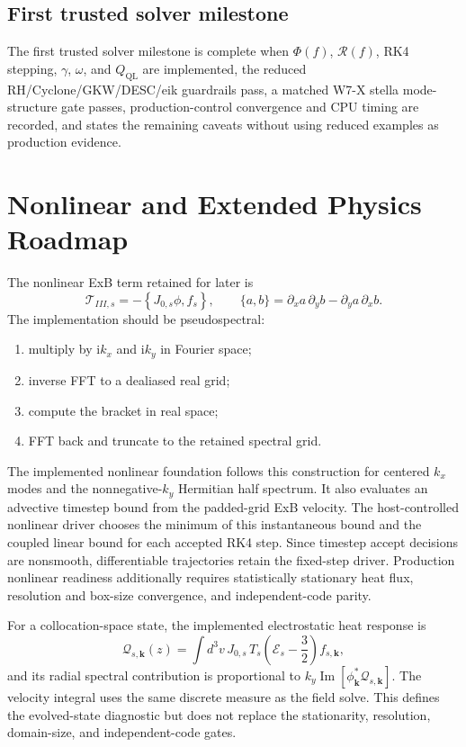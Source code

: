 \documentclass[11pt,a4paper]{article}
\newcommand{\ii}{\mathrm{i}}
\newcommand{\RHS}{\mathcal{R}}
\begin{document}
\subsection{First trusted solver milestone}

The first trusted solver milestone is complete when \(\Phi(f)\), \(\RHS(f)\),
RK4 stepping, \(\gamma\), \(\omega\), and \(Q_{\mathrm{QL}}\) are implemented,
the reduced RH/Cyclone/GKW/DESC/eik guardrails pass, a matched W7-X stella
mode-structure gate passes, production-control convergence and CPU timing are
recorded, and  states the remaining caveats without using
reduced examples as production evidence.

\appendix
\section{Nonlinear and Extended Physics Roadmap}
\label{sec:nonlinear-extension}

The nonlinear ExB term retained for later is
\begin{equation}
  \mathcal{T}_{III,s}
  =
  -\left\{J_{0,s}\phi,f_s\right\},
  \qquad
  \{a,b\}
  =
  \partial_x a\,\partial_y b-\partial_y a\,\partial_x b.
  \label{eq:nonlinear-bracket}
\end{equation}
The implementation should be pseudospectral:
\begin{enumerate}
  \item multiply by \(\ii k_x\) and \(\ii k_y\) in Fourier space;
  \item inverse FFT to a dealiased real grid;
  \item compute the bracket in real space;
  \item FFT back and truncate to the retained spectral grid.
\end{enumerate}
The implemented nonlinear foundation follows this construction for centered
$k_x$ modes and the nonnegative-$k_y$ Hermitian half spectrum.  It also
evaluates an advective timestep bound from the padded-grid ExB velocity.  The
host-controlled nonlinear driver chooses the minimum of this instantaneous
bound and the coupled linear bound for each accepted RK4 step.  Since timestep
accept decisions are nonsmooth, differentiable trajectories retain the
fixed-step driver. Production nonlinear readiness additionally requires
statistically stationary heat flux, resolution and box-size convergence, and
independent-code parity.

For a collocation-space state, the implemented electrostatic heat response is
\begin{equation}
  \mathcal{Q}_{s,\mathbf{k}}(z)
  = \int d^3v\,J_{0,s}\,T_s
    \left(\mathcal{E}_s-\frac{3}{2}\right)f_{s,\mathbf{k}},
\end{equation}
and its radial spectral contribution is proportional to
\(k_y\operatorname{Im}[\phi_{\mathbf{k}}^*\mathcal{Q}_{s,\mathbf{k}}]\).
The velocity integral uses the same discrete measure as the field solve.  This
defines the evolved-state diagnostic but does not replace the stationarity,
resolution, domain-size, and independent-code gates.
\end{document}
